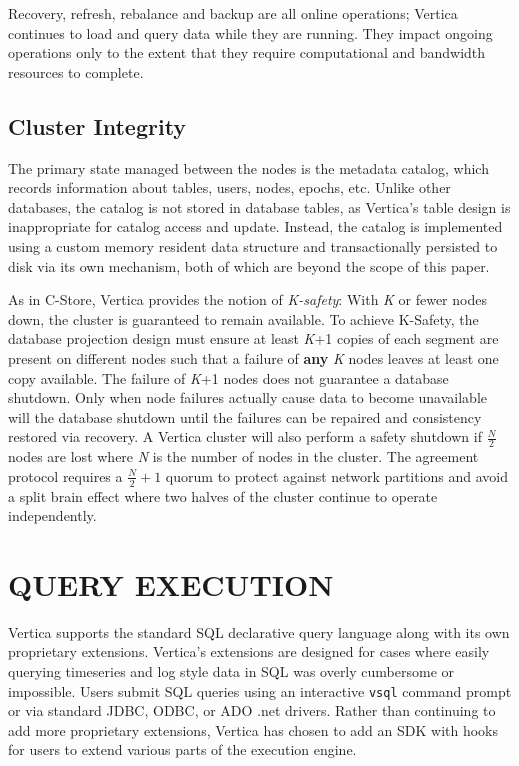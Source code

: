\documentclass[a4paper,12pt,notitlepage,twoside,openright]{article}
\begin{document}
Recovery, refresh, rebalance and backup are all online operations;
Vertica continues to load and query data while they are running. They
impact ongoing operations only to the extent that they require
computational and bandwidth resources to complete.

\hypertarget{cluster-integrity}{%
\subsection{Cluster Integrity}\label{cluster-integrity}}

The primary state managed between the nodes is the metadata catalog,
which records information about tables, users, nodes, epochs, etc.
Unlike other databases, the catalog is not stored in database tables, as
Vertica's table design is inappropriate for catalog access and update.
Instead, the catalog is implemented using a custom memory resident data
structure and transactionally persisted to disk via its own mechanism,
both of which are beyond the scope of this paper.

As in C-Store, Vertica provides the notion of \emph{K-safety}: With
\emph{K} or fewer nodes down, the cluster is guaranteed to remain
available. To achieve K-Safety, the database projection design must
ensure at least \emph{K}+1 copies of each segment are present on
different nodes such that a failure of \textbf{any} \emph{K} nodes
leaves at least one copy available. The failure of \emph{K}+1 nodes does
not guarantee a database shutdown. Only when node failures actually
cause data to become unavailable will the database shutdown until the
failures can be repaired and consistency restored via recovery. A
Vertica cluster will also perform a safety shutdown if \(\frac{N}{2}\) nodes
are lost where \emph{N} is the number of nodes in the cluster. The
agreement protocol requires a \(\frac{N}{2} + 1\)
quorum to protect against network partitions and avoid a split brain
effect where two halves of the cluster continue to operate
independently.

\hypertarget{query-execution}{%
\section{QUERY EXECUTION}\label{query-execution}}

Vertica supports the standard SQL declarative query language along with
its own proprietary extensions. Vertica's extensions are designed for
cases where easily querying timeseries and log style data in SQL was
overly cumbersome or impossible. Users submit SQL queries using an
interactive \texttt{vsql} command prompt or via standard JDBC, ODBC, or ADO .net
drivers. Rather than continuing to add more proprietary extensions,
Vertica has chosen to add an SDK with hooks for users to extend various
parts of the execution engine.
\end{document}
